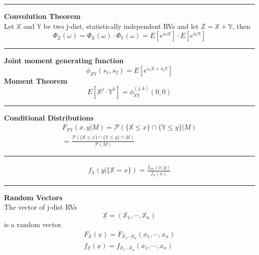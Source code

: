 \documentclass{article}
\renewcommand{\P}{\mathcal{P}}
\providecommand{\X}{\mathbb{X}}
\providecommand{\Y}{\mathbb{Y}}
\providecommand{\Z}{\mathbb{Z}}
\begin{document}
\begin{multicols*}{3}
        \noindent\rule{\columnwidth}{0.4pt}

        \textbf{Convolution Theorem}\\
        Let $\X$ and $\Y$ be two j-dist, statistically independent RVs and let $\Z=\X+\Y$, then
        \begin{equation*}
            \Phi_{\Z}(\omega) = \Phi_{\X}(\omega)\cdot\Phi_{\Y}(\omega) = E[e^{i\omega\X}]\cdot E[e^{i\omega\Y}]
        \end{equation*}

        \noindent\rule{\columnwidth}{0.4pt}

        \textbf{Joint moment generating function}
        \begin{equation*}
            \phi_{\X\Y}(s_1,s_2) = E[e^{s_1 \X + s_2 \Y}]
        \end{equation*}
        \textbf{Moment Theorem}
        \begin{equation*}
            E[\X^j\cdot\Y^k] = \phi_{\X\Y}^{(j,k)}(0,0)
        \end{equation*}

        \noindent\rule{\columnwidth}{0.4pt}

        \textbf{Conditional Distributions}
        \begin{equation*}
            \begin{gathered}
                F_{\X\Y}(x,y|M) = \P(\{\X\leq x\}\cap\{\Y\leq y\}|M)\\
                = \frac{\P(\{\X\leq x\}\cap\{\Y\leq y\}\cap M)}{\P(M)}
            \end{gathered}
        \end{equation*}

        \noindent\rule{\columnwidth}{0.4pt}

        \begin{equation*}
            \begin{gathered}
                f_{\Y}(y|\{\X=x\}) = \frac{f_{\X\Y}(x,y)}{f_\X(x)}
            \end{gathered}
        \end{equation*}

        \noindent\rule{\columnwidth}{0.4pt}

        \textbf{Random Vectors}\\
        The vector of j-dist RVs
        \begin{equation*}
            \underline{\X} = (\X_1,\cdots,\X_n)
        \end{equation*}
        is a random vector.
        \begin{equation*}
            \begin{gathered}
                F_{\underline{\X}}(\underline{x}) = F_{\X_1\cdots\X_n}(x_1,\cdots,x_n)\\
                f_{\underline{\X}}(\underline{x}) = f_{\X_1\cdots\X_n}(x_1,\cdots,x_n)\\
            \end{gathered}
        \end{equation*}


\end{multicols*}
\end{document}

